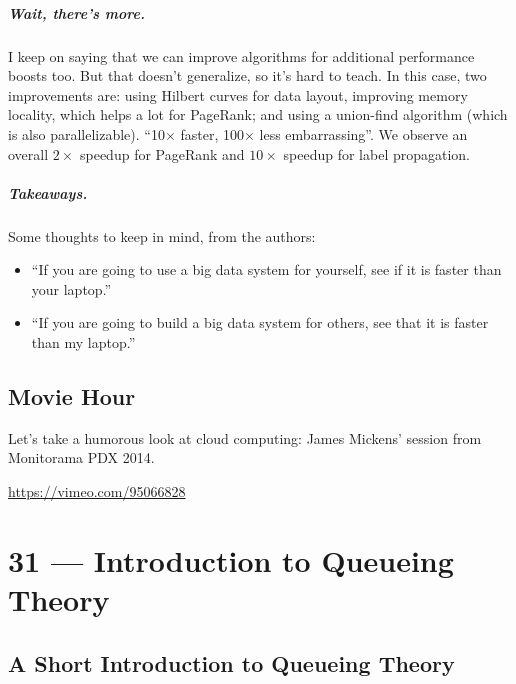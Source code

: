 \documentclass[a4paper]{report}
\begin{document}
\paragraph{Wait, there's more.} I keep on saying that we can improve algorithms for additional performance boosts too.
But that doesn't generalize, so it's hard to teach. In this case, two improvements are: using Hilbert curves
for data layout, improving memory locality, which helps a lot for PageRank; and using a union-find algorithm 
(which is also parallelizable). ``10$\times$ faster, 100$\times$ less embarrassing''.  We observe an overall
$2\times$ speedup for PageRank and $10\times$ speedup for label propagation.

\paragraph{Takeaways.} Some thoughts to keep in mind, from the authors:
\begin{itemize}
\item    ``If you are going to use a big data system for yourself, see if it is faster than your laptop.''
\item    ``If you are going to build a big data system for others, see that it is faster than my laptop.''
\end{itemize}



\section*{Movie Hour}
Let's take a humorous look at cloud computing: James Mickens' session from Monitorama PDX 2014. 

\begin{center}
\url{https://vimeo.com/95066828}
\end{center}









\chapter*{31 --- Introduction to Queueing Theory}


\section*{A Short Introduction to Queueing Theory}
\end{document}
